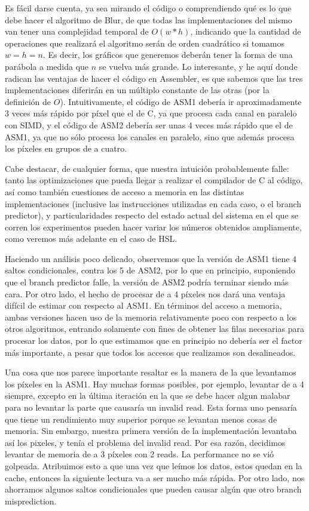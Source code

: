Es fácil darse cuenta, ya sea mirando el código o comprendiendo qué es lo que debe hacer el algoritmo de Blur, de que todas las implementaciones del mismo van tener una complejidad temporal de $O(w*h)$, indicando que la cantidad de operaciones que realizará el algoritmo serán de orden cuadrático si tomamos $w = h = n$. Es decir, los gráficos que generemos deberán tener la forma de una parábola a medida que $n$ se vuelva más grande. Lo interesante, y he aquí donde radican las ventajas de hacer el código en Assembler, es que sabemos que las tres implementaciones diferirán en un múltiplo constante de las otras (por la definición de $O$). Intuitivamente, el código de ASM1 debería ir aproximadamente 3 veces más rápido por píxel que el de C, ya que procesa cada canal en paralelo con SIMD, y el código de ASM2 debería ser unas 4 veces más rápido que el de ASM1, ya que no sólo procesa los canales en paralelo, sino que además procesa los píxeles en grupos de a cuatro.

Cabe destacar, de cualquier forma, que nuestra intuición probablemente falle: tanto las optimizaciones que pueda llegar a realizar el compilador de C al código, así como también cuestiones de acceso a memoria en las distintas implementaciones (inclusive las instrucciones utilizadas en cada caso, o el branch predictor), y particularidades respecto del estado actual del sistema en el que se corren los experimentos pueden hacer variar los números obtenidos ampliamente, como veremos más adelante en el caso de HSL.

Haciendo un análisis poco delicado, observemos que la versión de ASM1 tiene 4 saltos condicionales, contra los 5 de ASM2, por lo que en principio, suponiendo que el branch predictor falle, la versión de ASM2 podría terminar siendo más cara. Por otro lado, el hecho de procesar de a 4 píxeles nos dará una ventaja difícil de estimar con respecto al ASM1. En términos del acceso a memoria, ambas versiones hacen uso de la memoria relativamente poco con respecto a los otros algoritmos, entrando solamente con fines de obtener las filas necesarias para procesar los datos, por lo que estimamos que en principio no debería ser el factor más importante, a pesar que todos los accesos que realizamos son desalineados.

Una cosa que nos parece importante resaltar es la manera de la que levantamos los píxeles en la ASM1. Hay muchas formas posibles, por ejemplo, levantar de a 4 siempre, excepto en la última iteración en la que se debe hacer algun malabar para no levantar la parte que causaría un invalid read.
Esta forma uno pensaría que tiene un rendimiento muy superior porque se levantan menos cosas de memoria.
Sin embargo, nuestra primera versión de la implementación levantaba así los pixeles, y tenía el problema del invalid read. Por esa razón, decidimos levantar de memoria de a 3 píxeles con 2 reads. La performance no se vió golpeada. Atribuimos esto a que una vez que leímos los datos, estos quedan en la cache, entonces la siguiente lectura va a ser mucho más rápida. Por otro lado, nos ahorramos algunos saltos condicionales que pueden causar algún que otro branch misprediction.

